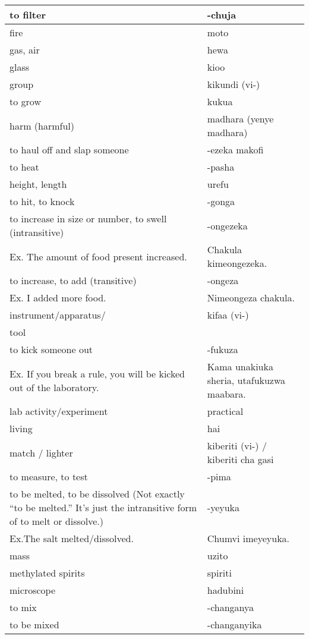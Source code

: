 \begin{center}
\begin{longtable}{|p{}|p{}|}
to filter	&	-chuja	\\	\hline
fire	&	moto	\\	\hline
gas, air	&	hewa	\\	\hline
glass	&	kioo	\\	\hline
group	&	kikundi (vi-)	\\	\hline
to grow	&	kukua	\\	\hline
harm (harmful)	&	madhara (yenye madhara)	\\	\hline
to haul off and slap someone	&	-ezeka makofi	\\	\hline
to heat	&	-pasha	\\	\hline
height, length	&	urefu	\\	\hline
to hit, to knock	&	-gonga	\\	\hline
to increase in size or number, to swell (intransitive)	&	-ongezeka	\\	
        Ex. The amount of food present increased.	&	        Chakula kimeongezeka.	\\	\hline
to increase, to add (transitive)	&	-ongeza	\\	
        Ex. I added more food.	&	        Nimeongeza chakula.	\\	\hline
instrument/apparatus/	&	kifaa (vi-)	\\	\hline
tool	&		\\	\hline
to kick someone out     	&	-fukuza 	\\	
        Ex. If you break a rule, you will be kicked out     of the laboratory.	&	Kama unakiuka sheria, utafukuzwa maabara.	\\	\hline
lab activity/experiment	&	practical	\\	\hline
living	&	hai	\\	\hline
match / lighter	&	kiberiti (vi-) / kiberiti cha gasi	\\	\hline
to measure, to test	&	-pima	\\	\hline
to be melted, to be dissolved (Not exactly “to be melted.” It's just the intransitive form of to melt or dissolve.)	&	-yeyuka 	\\	
        Ex.The salt melted/dissolved.	&	        Chumvi imeyeyuka.	\\	\hline
mass	&	uzito	\\	\hline
methylated spirits	&	spiriti	\\	\hline
microscope	&	hadubini	\\	\hline
to mix	&	-changanya	\\	\hline
to be mixed	&	-changanyika	\\	\hline

\end{longtable}
\end{center}
